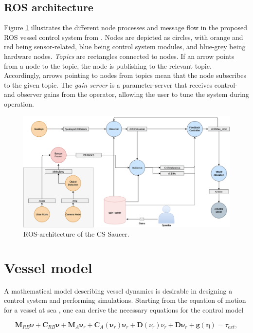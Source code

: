 \subsection{ROS architecture}

Figure \ref{fig:ros-flow} illustrates the different node processes and message flow in the proposed ROS vessel control system from \citet{solheim-master}. Nodes are depicted as circles, with orange and red being sensor-related, blue being control system modules, and blue-grey being hardware nodes. \textit{Topics} are rectangles connected to nodes. If an arrow points from a node to the topic, the node is publishing to the relevant topic. Accordingly, arrows pointing to nodes from topics mean that the node subscribes to the given topic. The \textit{gain server} is a parameter-server that receives control- and observer gains from the operator, allowing the user to tune the system during operation.   

\begin{figure}[H]
    \centering
    \includegraphics[width=\textwidth]{Images/ROS-topology(3).png}
    \caption{ROS-architecture of the CS Saucer.}
    \label{fig:ros-flow}
\end{figure}

\section{Vessel model}

\label{sec:modeling}

A mathematical model describing vessel dynamics is desirable in designing a control system and performing simulations. Starting from the equation of motion for a vessel at sea \citep{fossen_2021}, one can derive the necessary equations for the control model 

\begin{equation}
    \mathbf{M}_{RB}\dot{\boldsymbol{\nu}} + \mathbf{C}_{RB}\boldsymbol{\nu} + \mathbf{M}_A\dot{\boldsymbol{\nu}}_r + \mathbf{C}_A(\boldsymbol{\nu}_r)\boldsymbol{\nu}_r + \mathbf{D}(\nu_r)\nu_r + \mathbf{D}\boldsymbol{\nu}_r + \mathbf{g}(\boldsymbol{\eta}) = \tau_{ext},
\end{equation}

